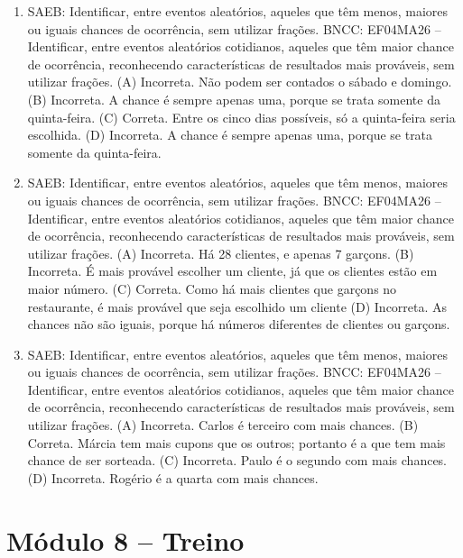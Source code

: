 \begin{enumerate}
\item
SAEB: Identificar, entre eventos aleatórios, aqueles que têm menos, maiores ou iguais chances de ocorrência, sem utilizar frações.
BNCC: EF04MA26 -- Identificar, entre eventos aleatórios cotidianos, aqueles que têm maior chance de
ocorrência, reconhecendo características de resultados mais prováveis, sem utilizar frações.
(A) Incorreta. Não podem ser contados o sábado e domingo.
(B) Incorreta. A chance é sempre apenas uma, porque se trata somente da quinta-feira.
(C) Correta. Entre os cinco dias possíveis, só a quinta-feira seria escolhida.
(D) Incorreta. A chance é sempre apenas uma, porque se trata somente da quinta-feira.

\item
SAEB: Identificar, entre eventos aleatórios, aqueles que têm menos, maiores ou iguais chances de ocorrência, sem utilizar frações.
BNCC: EF04MA26 -- Identificar, entre eventos aleatórios cotidianos, aqueles que têm maior chance de
ocorrência, reconhecendo características de resultados mais prováveis, sem utilizar frações.
(A) Incorreta. Há 28 clientes, e apenas 7 garçons.
(B) Incorreta. É mais provável escolher um cliente, já que os clientes estão em maior número.
(C) Correta. Como há mais clientes que garçons no restaurante, é mais provável que seja escolhido um cliente
(D) Incorreta. As chances não são iguais, porque há números diferentes de clientes ou garçons.

\item
SAEB: Identificar, entre eventos aleatórios, aqueles que têm menos, maiores ou iguais chances de ocorrência, sem utilizar frações.
BNCC: EF04MA26 -- Identificar, entre eventos aleatórios cotidianos, aqueles que têm maior chance de
ocorrência, reconhecendo características de resultados mais prováveis, sem utilizar frações.
(A) Incorreta. Carlos é terceiro com mais chances.
(B) Correta. Márcia tem mais cupons que os outros; portanto é a que tem mais chance de ser sorteada.
(C) Incorreta. Paulo é o segundo com mais chances.
(D) Incorreta. Rogério é a quarta com mais chances.
\end{enumerate}

\section*{Módulo 8 – Treino}


